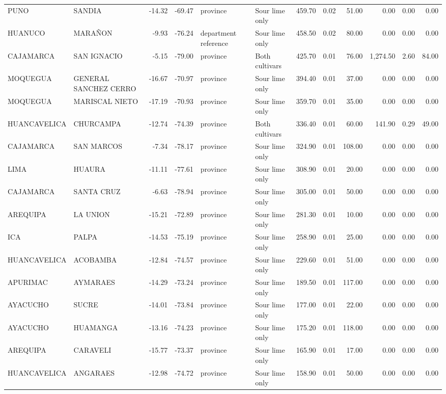 \begin{longtable}{llrrllrrrrrr}
PUNO & SANDIA & -14.32 & -69.47 & province & Sour lime only & 459.70 & 0.02 & 51.00 & 0.00 & 0.00 & 0.00 \\
HUANUCO & MARAÑON & -9.93 & -76.24 & department reference & Sour lime only & 458.50 & 0.02 & 80.00 & 0.00 & 0.00 & 0.00 \\
CAJAMARCA & SAN IGNACIO & -5.15 & -79.00 & province & Both cultivars & 425.70 & 0.01 & 76.00 & 1,274.50 & 2.60 & 84.00 \\
MOQUEGUA & GENERAL SANCHEZ CERRO & -16.67 & -70.97 & province & Sour lime only & 394.40 & 0.01 & 37.00 & 0.00 & 0.00 & 0.00 \\
MOQUEGUA & MARISCAL NIETO & -17.19 & -70.93 & province & Sour lime only & 359.70 & 0.01 & 35.00 & 0.00 & 0.00 & 0.00 \\
HUANCAVELICA & CHURCAMPA & -12.74 & -74.39 & province & Both cultivars & 336.40 & 0.01 & 60.00 & 141.90 & 0.29 & 49.00 \\
CAJAMARCA & SAN MARCOS & -7.34 & -78.17 & province & Sour lime only & 324.90 & 0.01 & 108.00 & 0.00 & 0.00 & 0.00 \\
LIMA & HUAURA & -11.11 & -77.61 & province & Sour lime only & 308.90 & 0.01 & 20.00 & 0.00 & 0.00 & 0.00 \\
CAJAMARCA & SANTA CRUZ & -6.63 & -78.94 & province & Sour lime only & 305.00 & 0.01 & 50.00 & 0.00 & 0.00 & 0.00 \\
AREQUIPA & LA UNION & -15.21 & -72.89 & province & Sour lime only & 281.30 & 0.01 & 10.00 & 0.00 & 0.00 & 0.00 \\
ICA & PALPA & -14.53 & -75.19 & province & Sour lime only & 258.90 & 0.01 & 25.00 & 0.00 & 0.00 & 0.00 \\
HUANCAVELICA & ACOBAMBA & -12.84 & -74.57 & province & Sour lime only & 229.60 & 0.01 & 51.00 & 0.00 & 0.00 & 0.00 \\
APURIMAC & AYMARAES & -14.29 & -73.24 & province & Sour lime only & 189.50 & 0.01 & 117.00 & 0.00 & 0.00 & 0.00 \\
AYACUCHO & SUCRE & -14.01 & -73.84 & province & Sour lime only & 177.00 & 0.01 & 22.00 & 0.00 & 0.00 & 0.00 \\
AYACUCHO & HUAMANGA & -13.16 & -74.23 & province & Sour lime only & 175.20 & 0.01 & 118.00 & 0.00 & 0.00 & 0.00 \\
AREQUIPA & CARAVELI & -15.77 & -73.37 & province & Sour lime only & 165.90 & 0.01 & 17.00 & 0.00 & 0.00 & 0.00 \\
HUANCAVELICA & ANGARAES & -12.98 & -74.72 & province & Sour lime only & 158.90 & 0.01 & 50.00 & 0.00 & 0.00 & 0.00 \\

\end{longtable}
